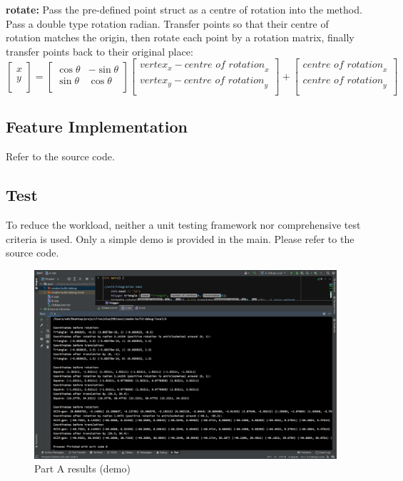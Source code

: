 \documentclass[12pt, a4paper]{article}
\begin{document}
\textbf{rotate:} Pass the pre-defined point struct as a centre of rotation into the method. Pass a double type rotation radian. Transfer points so that their centre of rotation matches the origin, then rotate each point by a rotation matrix, finally transfer points back to their original place:
\begin{equation} 
  \begin{bmatrix}
    x \\
    y \\
  \end{bmatrix}
  =
  \begin{bmatrix}
    \cos\theta & -\sin\theta \\
    \sin\theta & \cos\theta \\
  \end{bmatrix}
  \begin{bmatrix}
    vertex_x - \textit{centre of rotation}_x \\
    vertex_y - \textit{centre of rotation}_y \\
  \end{bmatrix}
  +
  \begin{bmatrix}
    \textit{centre of rotation}_x \\
    \textit{centre of rotation}_y \\
  \end{bmatrix}
\end{equation}

\subsection{Feature Implementation}
Refer to the source code.

\subsection{Test}
To reduce the workload, neither a unit testing framework nor comprehensive test criteria is used. Only a simple demo is provided in the main. Please refer to the source code.

\begin{figure}[htbp]
  \begin{centering}
    \includegraphics[width=1\textwidth]{A_results}
    \caption{Part A results (demo)}
  \end{centering}
  \label{fig:A_demo}
\end{figure}
\end{document}
